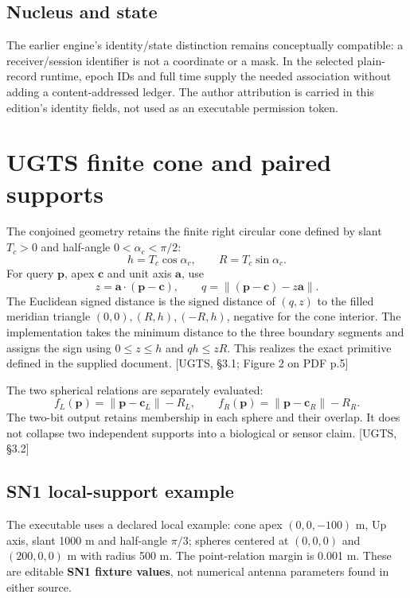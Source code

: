 \documentclass[11pt,a4paper]{article}
\newcommand{\uRef}[1]{\textcolor{muted}{[UGTS, #1]}}
\begin{document}
\subsection{Nucleus and state}
The earlier engine's identity/state distinction remains conceptually compatible: a receiver/session identifier
is not a coordinate or a mask. In the selected plain-record runtime, epoch IDs and full time supply the needed
association without adding a content-addressed ledger. The author attribution is carried in this edition's
identity fields, not used as an executable permission token.
\clearpage
\section{UGTS finite cone and paired supports}
The conjoined geometry retains the finite right circular cone defined by slant $T_c>0$ and half-angle
$0<\alpha_c<\pi/2$:
\begin{equation}
h=T_c\cos\alpha_c,\qquad R=T_c\sin\alpha_c.
\end{equation}
For query $\mathbf p$, apex $\mathbf c$ and unit axis $\mathbf a$, use
\begin{equation}
z=\mathbf a\cdot(\mathbf p-\mathbf c),\qquad
q=\|(\mathbf p-\mathbf c)-z\mathbf a\|.
\end{equation}
The Euclidean signed distance is the signed distance of $(q,z)$ to the filled meridian triangle
$(0,0),(R,h),(-R,h)$, negative for the cone interior. The implementation takes the minimum distance to the
three boundary segments and assigns the sign using $0\le z\le h$ and $qh\le zR$. This realizes the exact
primitive defined in the supplied document. \uRef{\S3.1; Figure 2 on PDF p.5}

The two spherical relations are separately evaluated:
\begin{equation}
f_L(\mathbf p)=\|\mathbf p-\mathbf c_L\|-R_L,\qquad
f_R(\mathbf p)=\|\mathbf p-\mathbf c_R\|-R_R.
\end{equation}
The two-bit output retains membership in each sphere and their overlap. It does not collapse two independent
supports into a biological or sensor claim. \uRef{\S3.2}

\subsection{SN1 local-support example}
The executable uses a declared local example: cone apex $(0,0,-100)$ m, Up axis, slant 1000 m and half-angle
$\pi/3$; spheres centered at $(0,0,0)$ and $(200,0,0)$ m with radius 500 m. The point-relation margin is
0.001 m. These are editable \textbf{SN1 fixture values}, not numerical antenna parameters found in either source.
\end{document}
